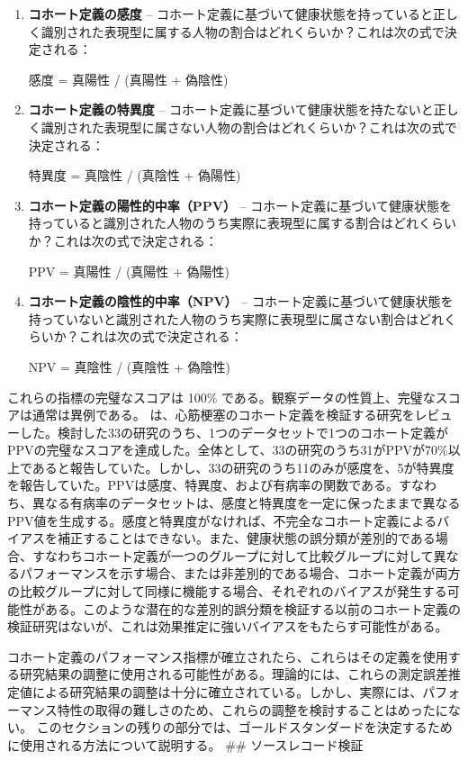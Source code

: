 \documentclass[
  11pt]{book}
\theoremstyle{definition}
\theoremstyle{definition}
\theoremstyle{definition}
\theoremstyle{definition}
\theoremstyle{remark}
\begin{document}
\begin{enumerate}
\def\labelenumi{\arabic{enumi}.}
\item
  \textbf{コホート定義の感度} -- コホート定義に基づいて健康状態を持っていると正しく識別された表現型に属する人物の割合はどれくらいか？これは次の式で決定される：

  感度 = 真陽性 / (真陽性 + 偽陰性)
\item
  \textbf{コホート定義の特異度} -- コホート定義に基づいて健康状態を持たないと正しく識別された表現型に属さない人物の割合はどれくらいか？これは次の式で決定される：

  特異度 = 真陰性 / (真陰性 + 偽陽性)
\item
  \textbf{コホート定義の陽性的中率（PPV）} -- コホート定義に基づいて健康状態を持っていると識別された人物のうち実際に表現型に属する割合はどれくらいか？これは次の式で決定される：

  PPV = 真陽性 / (真陽性 + 偽陽性)
\item
  \textbf{コホート定義の陰性的中率（NPV）} -- コホート定義に基づいて健康状態を持っていないと識別された人物のうち実際に表現型に属さない割合はどれくらいか？これは次の式で決定される：

  NPV = 真陰性 / (真陰性 + 偽陰性)
\end{enumerate}

これらの指標の完璧なスコアは 100\% である。観察データの性質上、完璧なスコアは通常は異例である。\citet{Rubbo2015phenotypes} は、心筋梗塞のコホート定義を検証する研究をレビューした。検討した33の研究のうち、1つのデータセットで1つのコホート定義がPPVの完璧なスコアを達成した。全体として、33の研究のうち31がPPVが70\%以上であると報告していた。しかし、33の研究のうち11のみが感度を、5が特異度を報告していた。PPVは感度、特異度、および有病率の関数である。すなわち、異なる有病率のデータセットは、感度と特異度を一定に保ったままで異なるPPV値を生成する。感度と特異度がなければ、不完全なコホート定義によるバイアスを補正することはできない。また、健康状態の誤分類が差別的である場合、すなわちコホート定義が一つのグループに対して比較グループに対して異なるパフォーマンスを示す場合、または非差別的である場合、コホート定義が両方の比較グループに対して同様に機能する場合、それぞれのバイアスが発生する可能性がある。このような潜在的な差別的誤分類を検証する以前のコホート定義の検証研究はないが、これは効果推定に強いバイアスをもたらす可能性がある。

コホート定義のパフォーマンス指標が確立されたら、これらはその定義を使用する研究結果の調整に使用される可能性がある。理論的には、これらの測定誤差推定値による研究結果の調整は十分に確立されている。しかし、実際には、パフォーマンス特性の取得の難しさのため、これらの調整を検討することはめったにない。
このセクションの残りの部分では、ゴールドスタンダードを決定するために使用される方法について説明する。
\#\# ソースレコード検証
\end{document}

